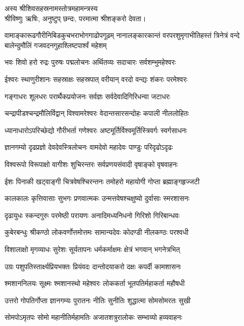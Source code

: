 अस्य श्रीशिवसहस्रनामस्तोत्रमहामन्त्रस्य \textsf{}\\
श्रीविष्णुः ऋषिः, अनुष्टुप् छन्दः, परमात्मा श्रीशङ्करो देवता।


{वामाङ्कारूढगौरीनिबिडकुचभराभोगगाढोपगूढम्}
{नानालङ्कारकान्तं वरपरशुमृगाभीतिहस्तं त्रिनेत्रं}
{वन्दे बालेन्दुमौलिं गजवदनगुहाश्लिष्टपार्श्वं महेशम्}

\twolineshloka
{भवः शिवो हरो रुद्रः पुरुषः पद्मलोचनः}
{अर्थितव्यः सदाचारः सर्वशम्भुमहेश्वरः}

\twolineshloka
{ईश्वरः स्थाणुरीशानः सहस्राक्षः सहस्रपात्}
{वरीयान् वरदो वन्द्यः शंकरः परमेश्वरः}

\twolineshloka
{गङ्गाधरः शूलधरः परार्थैकप्रयोजनः}
{सर्वज्ञः सर्वदेवादिगिरिधन्वा जटाधरः}

\twolineshloka
{चन्द्रापीडश्चन्द्रमौलिर्विद्वान् विश्वामरेश्वरः}
{वेदान्तसारसन्दोहः कपाली नीललोहितः}

\twolineshloka
{ध्यानाधारोऽपरिच्छेद्यो गौरीभर्ता गणेश्वरः}
{अष्टमूर्तिर्विश्वमूर्तिस्त्रिवर्गः स्वर्गसाधनः}

\twolineshloka
{ज्ञानगम्यो दृढप्रज्ञो देवदेवस्त्रिलोचनः}
{वामदेवो महादेवः पाण्डुः परिदृढोऽदृढः}

\twolineshloka
{विश्वरूपो विरूपाक्षो वागीशः शुचिरन्तरः}
{सर्वप्रणयसंवादी वृषाङ्को वृषवाहनः}

\twolineshloka
{ईशः पिनाकी खट्वाङ्गी चित्रवेषश्चिरन्तनः}
{तमोहरो महायोगी गोप्ता ब्रह्माङ्गहृज्जटी}

\twolineshloka
{कालकालः कृत्तिवासाः सुभगः प्रणवात्मकः}
{उन्मत्तवेषश्चक्षुष्यो दुर्वासाः स्मरशासनः}

\twolineshloka
{दृढायुधः स्कन्दगुरुः परमेष्ठी परायणः}
{अनादिमध्यनिधनो गिरिशो गिरिबान्धवः}

\twolineshloka
{कुबेरबन्धुः श्रीकण्ठो लोकवर्णोत्तमोत्तमः}
{सामान्यदेवः कोदण्डी नीलकण्ठः परश्वधी}

\twolineshloka
{विशालाक्षो मृगव्याधः सुरेशः सूर्यतापनः}
{धर्मकर्माक्षमः क्षेत्रं भगवान् भगनेत्रभित्}

\twolineshloka
{उग्रः पशुपतिस्तार्क्ष्यप्रियभक्तः प्रियंवदः}
{दान्तोदयाकरो दक्षः कपर्दी कामशासनः}

\twolineshloka
{श्मशाननिलयः सूक्ष्मः श्मशानस्थो महेश्वरः}
{लोककर्ता भूतपतिर्महाकर्ता महौषधी}

\twolineshloka
{उत्तरो गोपतिर्गोप्ता ज्ञानगम्यः पुरातनः}
{नीतिः सुनीतिः शुद्धात्मा सोमसोमरतः सुखी}

\twolineshloka
{सोमपोऽमृतपः सोमो महानीतिर्महामतिः}
{अजातशत्रुरालोकः सम्भाव्यो हव्यवाहनः}


